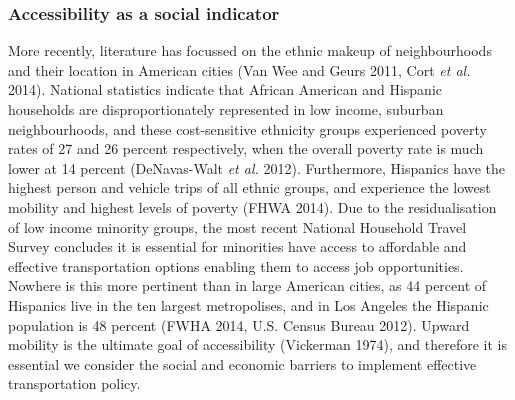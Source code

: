 \documentclass[a4paper,UKenglish]{lipics-v2018}
\begin{document}
\subsubsection{Accessibility as a social indicator}
More recently, literature has focussed on the ethnic makeup of neighbourhoods and their location in American cities (Van Wee and Geurs 2011, Cort \textit{et al.} 2014). National statistics indicate that African American and Hispanic households are disproportionately represented in low income, suburban neighbourhoods, and these cost-sensitive ethnicity groups experienced poverty rates of 27 and 26 percent respectively, when the overall poverty rate is much lower at 14 percent (DeNavas-Walt \textit{et al.} 2012). Furthermore, Hispanics have the highest person and vehicle trips of all ethnic groups, and experience the lowest mobility and highest levels of poverty (FHWA 2014). Due to the residualisation of low income minority groups, the most recent National Household Travel Survey concludes it is essential for minorities have access to affordable and effective transportation options enabling them to access job opportunities. Nowhere is this more pertinent than in large American cities, as 44 percent of Hispanics live in the ten largest metropolises, and in Los Angeles the Hispanic population is 48 percent (FWHA 2014, U.S. Census Bureau 2012). Upward mobility is the ultimate goal of accessibility (Vickerman 1974), and therefore it is essential we consider the social and economic barriers to implement effective transportation policy.
\end{document}
